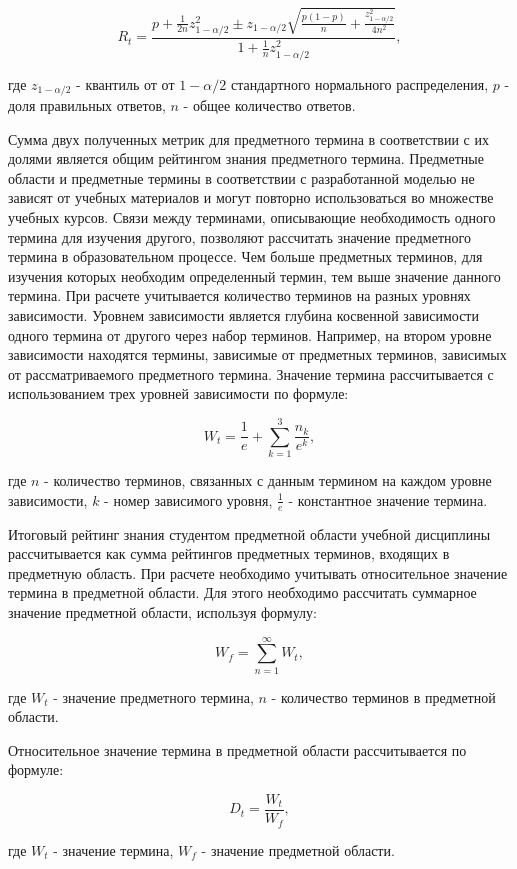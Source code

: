 $$
    R_t = \frac{p+\frac{1}{2n}z_{1-\alpha/2}^2 \pm z_{1-\alpha/2}\sqrt{\frac{p(1-p)}{n}+\frac{z_{1-\alpha/2}^2}{4n^2}}{} }{1+\frac{1}{n}z_{1-\alpha/2}^2},
$$

где \(z_{1-\alpha/2}\) - квантиль от от \(1-\alpha/2\) стандартного нормального распределения, \(p\) - доля правильных ответов, \(n\) - общее количество ответов. 

Сумма двух полученных метрик для предметного термина в соответствии с их долями является общим рейтингом знания предметного термина. Предметные области и предметные термины в соответствии с разработанной моделью не зависят от учебных материалов и могут повторно использоваться во множестве учебных курсов. Связи между терминами, описывающие необходимость одного термина для изучения другого, позволяют рассчитать значение предметного термина в образовательном процессе. Чем больше предметных терминов, для изучения которых необходим определенный термин, тем выше значение данного термина. При расчете учитывается количество терминов на разных уровнях зависимости. Уровнем зависимости является глубина косвенной зависимости одного термина от другого через набор терминов. Например, на втором уровне зависимости находятся термины, зависимые от предметных терминов, зависимых от рассматриваемого предметного термина. Значение термина рассчитывается с использованием трех уровней зависимости по формуле: 

$$
    W_t = \frac{1}{e}+\sum_{k=1}^{3}\frac{n_k}{e^k}, 
$$

где \(n\) - количество терминов, связанных с данным термином на каждом уровне зависимости, \(k\) - номер зависимого уровня, \( \frac{1}{e} \) - константное значение термина. 

Итоговый рейтинг знания студентом предметной области учебной дисциплины рассчитывается как сумма рейтингов предметных терминов, входящих в предметную область. При расчете необходимо учитывать относительное значение термина в предметной области. Для этого необходимо рассчитать суммарное значение предметной области, используя формулу:

$$  
    W_f = \sum_{n=1}^{\infty}W_t,
$$

где \(W_t\) - значение предметного термина, \(n\) - количество терминов в предметной области.

Относительное значение термина в предметной области рассчитывается по формуле:

$$
    D_t = \frac{W_t}{W_f},
$$

где \(W_t\) - значение термина, \(W_f\) - значение предметной области.

